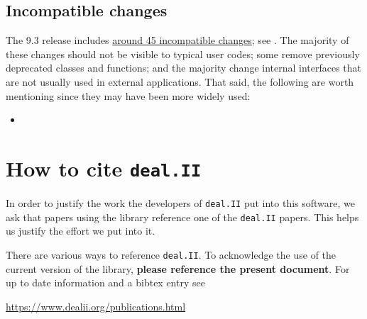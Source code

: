 \documentclass{ansarticle-preprint}
\newcommand{\specialword}[1]{\texttt{#1}}
\newcommand{\dealii}{{\specialword{deal.II}}\xspace}
\begin{document}
\subsection{Incompatible changes}

The 9.3 release includes
\href{https://dealii.org/developer/doxygen/deal.II/changes_between_9_2_0_and_9_3_0.html}
{around 45 incompatible changes}; see \cite{changes93}. The majority of these changes
should not be visible to typical user codes; some remove previously
deprecated classes and functions; and the majority change internal
interfaces that are not usually used in external
applications. That said, the following are worth mentioning since they
may have been more widely used:
\begin{itemize}
  \item 
\end{itemize}



\section{How to cite \dealii}\label{sec:cite}

In order to justify the work the developers of \dealii{} put into this
software, we ask that papers using the library reference one of the
\dealii{} papers. This helps us justify the effort we put into it.

There are various ways to reference \dealii{}. To acknowledge the use of
the current version of the library, \textbf{please reference the present
  document}. For up to date information and a bibtex entry
see
\begin{center}
  \url{https://www.dealii.org/publications.html}
\end{center}
\end{document}
